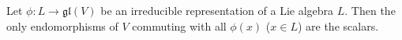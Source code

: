 Let $\phi: L \rightarrow \mathfrak{gl}(V)$ be an irreducible representation of a Lie algebra $L$. Then the only endomorphisms of $V$ commuting with all $\phi(x)$ ($x \in L$) are the scalars.
